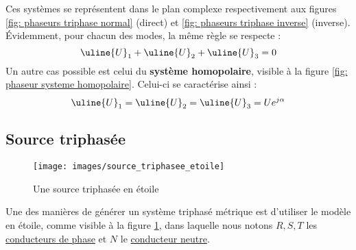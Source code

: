 \documentclass[12pt,a4paper]{article}
\newcommand{\uu}{\uline{U} }
\begin{document}
Ces systèmes se représentent dans le plan complexe respectivement aux figures \ref{fig: phaseurs triphase normal} (direct) et \ref{fig: phaseurs triphase inverse} (inverse). Évidemment, pour chacun des modes, la même règle se respecte :
\begin{equation}
	\uu_1 + \uu_2 + \uu_3 = 0
\end{equation}
Un autre cas possible est celui du \textbf{système homopolaire}, visible à la figure \ref{fig: phaseur systeme homopolaire}. Celui-ci se caractérise ainsi :
\textcolor{green}{\begin{equation}
\uu_1 = \uu_2 = \uu_3 = Ue^{j\alpha}
\end{equation}}

\subsection{Source triphasée}
\begin{figure}
	\centering
	\texttt{[image: images/source\_triphasee\_etoile]}
	\caption{Une source triphasée en étoile}
	\label{fig: source triphasee etoile}
\end{figure}
Une des manières de générer un système triphasé métrique est d'utiliser le modèle en étoile, comme visible à la figure \ref{fig: source triphasee etoile}, dans laquelle nous notons $R,S,T$ les \uline{conducteurs de phase} et $N$ le \uline{conducteur neutre}. 
\end{document}
